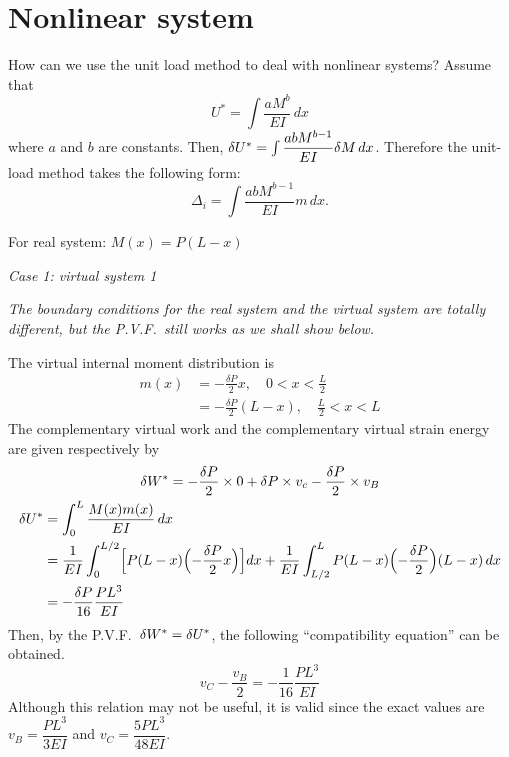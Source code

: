 \section{Nonlinear system}
How can we use the unit load method to deal with nonlinear systems? Assume that
\begin{equation*}
  U^* = \int\frac{aM^b}{EI}\,dx
\end{equation*}
where $a$ and $b$ are constants. Then, $\delta U^* = \int\dfrac{abM^{b-1}}{EI}\delta M\,dx$. Therefore the unit-load method takes the following form:
\begin{equation}
  \Delta_i = \int\frac{abM^{b-1}}{EI}m\,dx.
\end{equation}

\begin{example}[Application of P.V.F.]
\leavevmode
\begin{fig}
  
\end{fig}
For real system: $M(x) = P(L-x)$

\emph{Case 1: virtual system 1}

\emph{The boundary conditions for the real system and the virtual system are totally different, but the P.V.F.\ still works as we shall show below.}

The virtual internal moment distribution is
\begin{align*}
  m(x) &= -\frac{\delta P}{2}x,\quad 0 < x < \frac L2\\
       &= -\frac{\delta P}{2}(L-x),\quad \frac L2 < x < L
\end{align*}
The complementary virtual work and the complementary virtual strain energy are given respectively by
\begin{gather*}
  \delta W^* = -\frac{\delta P}{2}\times0 + \delta P\times v_c - \frac{\delta P}{2}\times v_B\\
  \begin{aligned}
    \delta U^* &= \int_0^L\frac{M(x)m(x)}{EI}\,dx\\
          &= \frac{1}{EI}\int_0^{L/2}\Bigl[P(L-x)\Bigl(-\frac{\delta P}{2}x\Bigr)\Bigr]dx + \frac{1}{EI}\int_{L/2}^LP(L-x)\Bigl(-\frac{\delta P}{2}\Bigr)(L-x)\,dx\\
          &= -\frac{\delta P}{16}\frac{PL^3}{EI}
  \end{aligned}
\end{gather*}
Then, by the P.V.F.\ $\delta W^* = \delta U^*$, the following ``compatibility equation'' can be obtained.
\begin{equation*}
  v_C - \frac{v_B}{2} = -\frac{1}{16}\frac{PL^3}{EI}
\end{equation*}
Although this relation may not be useful, it is valid since the exact values are $v_B = \dfrac{PL^3}{3EI}$ and $v_C = \dfrac{5PL^3}{48EI}$.


\end{example}
